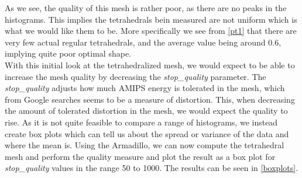 As we see, the quality of this mesh is rather poor, as there are no peaks in the histograms. This implies the tetrahedrals bein measured are not uniform which is what we would like them to be. More specifically we see from \autoref{pt1} that there are very few actual regular tetrahedrals, and the average value being around 0.6, implying quite poor optimal shape.\\
With this initial look at the tetrahedralized mesh, we would expect to be able to increase the mesh quality by decreasing the \textit{stop\_quality} parameter. The \textit{stop\_quality} adjusts how much AMIPS energy is tolerated in the mesh, which from Google searches seems to be a measure of distortion. This, when decreasing the amount of tolerated distortion in the mesh, we would expect the quality to rise. As it is not quite feasible to compare a range of histograms, we instead create box plots which can tell us about the spread or variance of the data and where the mean is. Using the Armadillo, we can now compute the tetrahedral mesh and perform the quality measure and plot the result as a box plot for \textit{stop\_quality} values in the range 50 to 1000. The results can be seen in \autoref{boxplots}.  

